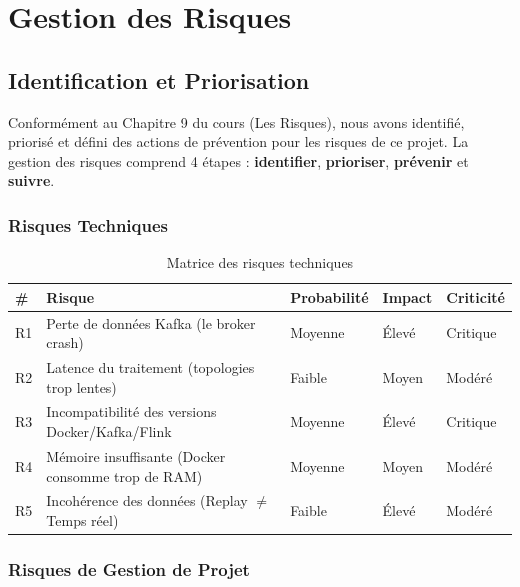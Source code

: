 \chapter{Gestion des Risques}

\section{Identification et Priorisation}

Conformément au Chapitre 9 du cours (Les Risques), nous avons identifié, priorisé et défini des actions de prévention pour les risques de ce projet. La gestion des risques comprend 4 étapes : \textbf{identifier}, \textbf{prioriser}, \textbf{prévenir} et \textbf{suivre}.

\subsection{Risques Techniques}

\begin{table}[H]
\centering
\begin{tabularx}{\textwidth}{C{0.7cm} X C{1.8cm} C{1.5cm} C{1.8cm}}
\toprule
\textbf{\color{primarycolor}\#} &
\textbf{\color{primarycolor}Risque} &
\textbf{\color{primarycolor}Probabilité} &
\textbf{\color{primarycolor}Impact} &
\textbf{\color{primarycolor}Criticité} \\
\midrule
R1 & Perte de données Kafka (le broker crash) & Moyenne & Élevé & Critique \\
\addlinespace[0.1cm]
R2 & Latence du traitement (topologies trop lentes) & Faible & Moyen & Modéré \\
\addlinespace[0.1cm]
R3 & Incompatibilité des versions Docker/Kafka/Flink & Moyenne & Élevé & Critique \\
\addlinespace[0.1cm]
R4 & Mémoire insuffisante (Docker consomme trop de RAM) & Moyenne & Moyen & Modéré \\
\addlinespace[0.1cm]
R5 & Incohérence des données (Replay $\neq$ Temps réel) & Faible & Élevé & Modéré \\
\bottomrule
\end{tabularx}
\caption{Matrice des risques techniques}
\end{table}

\subsection{Risques de Gestion de Projet}

